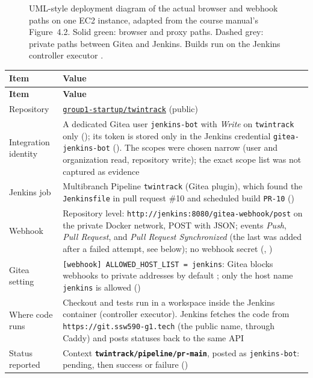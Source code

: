 \begin{figure}[htbp]
\centering
\resizebox{\linewidth}{!}{}
\caption{UML-style deployment diagram of the actual browser and webhook paths on one EC2 instance, adapted from the course manual's Figure~4.2. Solid green: browser and proxy paths. Dashed grey: private paths between Gitea and Jenkins. Builds run on the Jenkins controller executor \cite{DosManual,JenkinsGiteaPlugin}.}
\label{Figure:JenkinsDeployment}
\end{figure}

\begin{tabularx}{\linewidth}{L{3.6cm}Y}
\caption{Gitea to Jenkins integration\label{Table:JenkinsIntegration}}\\
\toprule \textbf{Item} & \textbf{Value}\\ \midrule
\endfirsthead
\toprule \textbf{Item} & \textbf{Value}\\ \midrule
\endhead \bottomrule \endlastfoot
Repository & \href{\GiteaURL/group1-startup/twintrack}{\texttt{group1-startup/twintrack}} (public)\\
Integration identity & A dedicated Gitea user \texttt{jenkins-bot} with \emph{Write} on \texttt{twintrack} only (); its token is stored only in the Jenkins credential \texttt{gitea-jenkins-bot} (). The scopes were chosen narrow (user and organization read, repository write); the exact scope list was not captured as evidence\\
Jenkins job & Multibranch Pipeline \texttt{twintrack} (Gitea plugin), which found the \texttt{Jenkinsfile} in pull request \#10 and scheduled build \texttt{PR-10} ()\\
Webhook & Repository level: \texttt{http://jenkins:8080/gitea-webhook/post} on the private Docker network, POST with JSON; events \emph{Push}, \emph{Pull Request}, and \emph{Pull Request Synchronized} (the last was added after a failed attempt, see below); no webhook secret (, )\\
Gitea setting & \texttt{[webhook] ALLOWED\_HOST\_LIST = jenkins}: Gitea blocks webhooks to private addresses by default \cite{GiteaConfig,GiteaWebhooks}; only the host name \texttt{jenkins} is allowed ()\\
Where code runs & Checkout and tests run in a workspace inside the Jenkins container (controller executor). Jenkins fetches the code from \texttt{https://git.ssw590-g1.tech} (the public name, through Caddy) and posts statuses back to the same API\\
Status reported & Context \textbf{\texttt{twintrack/pipeline/pr-main}}, posted as \texttt{jenkins-bot}: pending, then success or failure ()\\
\end{tabularx}


